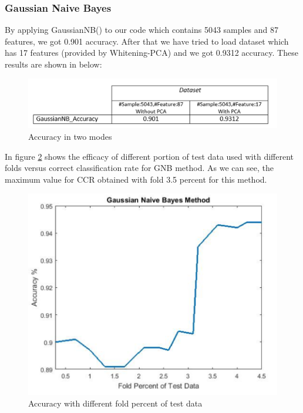 \documentclass[journal,transmag]{IEEEtran}
\begin{document}
			\subsubsection{Gaussian Naive Bayes}
By applying GaussianNB()  to our code which contains 5043 samples and 87 features, we got 0.901 accuracy. After that we have tried to load dataset which has 17 features (provided by Whitening-PCA) and we got 0.9312 accuracy. These results are shown in below:	
\begin{figure}
\includegraphics[scale=.26]{figfoj1.png}
 \caption{Accuracy in two modes}
\label{fig_foj1}
\end{figure}
In figure \ref{fig_foj2} shows the efficacy of different portion of test data used with different folds versus correct classification rate for GNB method. As we can see, the maximum value for CCR obtained with fold 3.5 percent for this method. 
\begin{figure}
\includegraphics[scale=.38]{figfoj2.png}
 \caption{Accuracy with different fold percent of test data}
\label{fig_foj2}
\end{figure}
\end{document}
